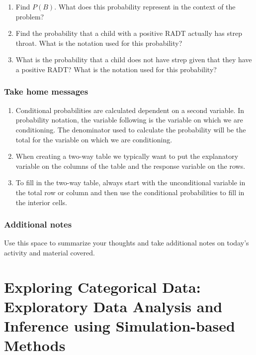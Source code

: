 \documentclass[
]{report}
\begin{document}
\begin{enumerate}
\def\labelenumi{\alph{enumi}.}
\setcounter{enumi}{2}
\item
  Find \(P(B)\). What does this probability represent in the context of the problem?
  \vspace{.8in}
\item
  Find the probability that a child with a positive RADT actually has strep throat. What is the notation used for this probability?
  \vspace{.8in}
\item
  What is the probability that a child does not have strep given that they have a positive RADT? What is the notation used for this probability?
\end{enumerate}

\vspace{0.8in}

\subsection{Take home messages}\label{take-home-messages-2}

\begin{enumerate}
\def\labelenumi{\arabic{enumi}.}
\item
  Conditional probabilities are calculated dependent on a second variable. In probability notation, the variable following \texttt{\textbar{}} is the variable on which we are conditioning. The denominator used to calculate the probability will be the total for the variable on which we are conditioning.
\item
  When creating a two-way table we typically want to put the explanatory variable on the columns of the table and the response variable on the rows.
\item
  To fill in the two-way table, always start with the unconditional variable in the total row or column and then use the conditional probabilities to fill in the interior cells.
\end{enumerate}

\subsection{Additional notes}\label{additional-notes-2}

Use this space to summarize your thoughts and take additional notes on today's activity and material covered.

\newpage

\chapter{Exploring Categorical Data: Exploratory Data Analysis and Inference using Simulation-based Methods}\label{exploring-categorical-data-exploratory-data-analysis-and-inference-using-simulation-based-methods}
\end{document}
